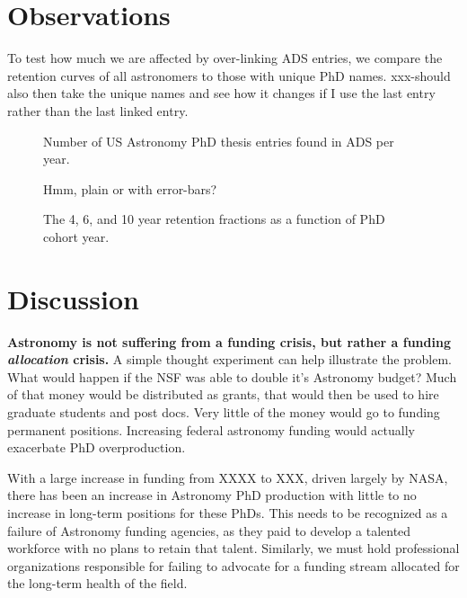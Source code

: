 \documentclass{emulateapj}
\begin{document}
\section{Observations}

To test how much we are affected by over-linking ADS entries, we compare the retention curves of all astronomers to those with unique PhD names.  xxx-should also then take the unique names and see how it changes if I use the last entry rather than the last linked entry.


\begin{figure}
  \caption{Number of US Astronomy PhD thesis entries found in ADS per year. \label{fig:phdperyear}}
\end{figure}

\begin{figure}
  \caption{ Hmm, plain or with error-bars? \label{fig:active_curves}}
  \end{figure}


\begin{figure}
  \caption{The 4, 6, and 10 year retention fractions as a function of PhD cohort year.\label{fig:retention}}
\end{figure}


\section{Discussion}

{\bf{Astronomy is not suffering from a funding crisis, but rather a funding {\emph{allocation}} crisis.}} A simple thought experiment can help illustrate the problem. What would happen if the NSF was able to double it's Astronomy budget? Much of that money would be distributed as grants, that would then be used to hire graduate students and post docs. Very little of the money would go to funding permanent positions. Increasing federal astronomy funding would actually exacerbate PhD overproduction. 

With a large increase in funding from XXXX to XXX, driven largely by NASA, there has been an increase in Astronomy PhD production with little to no increase in long-term positions for these PhDs.  This needs to be recognized as a failure of Astronomy funding agencies, as they paid to develop a talented workforce with no plans to retain that talent. Similarly, we must hold professional organizations responsible for failing to advocate for a funding stream allocated for the long-term health of the field.  
\end{document}
